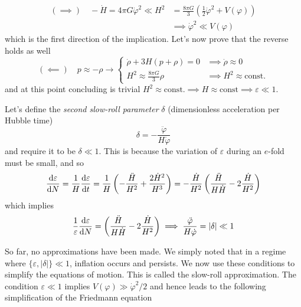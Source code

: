 \begin{align*}
    (\implies) \quad -\dot{H} = 4\pi G \dot{\varphi}^{2} \ll H^{2} &= \frac{8\pi G}{3}\left(\frac{1}{2}\dot{\varphi}^{2}+V(\varphi)\right) \\
    & \implies \dot{\varphi}^{2}\ll V(\varphi)
\end{align*}
which is the first direction of the implication. Let's now prove that the reverse holds as well
\begin{equation}
    (\impliedby) \quad p\approx -\rho \to
    \left\{
        \begin{array}{ll}
            \dot{\rho} +3H(p+\rho) = 0 & \implies \dot{\rho}\approx 0\\
            H^{2} \approx \frac{8\pi G}{3}\rho & \implies H^{2} \approx \text{const.}
        \end{array}
    \right.
\end{equation}
and at this point concluding is trivial $H^{2} \approx \text{const.} \implies H \approx \text{const} \implies \varepsilon \ll 1$.
\par Let's define the \emph{second slow-roll parameter} $\delta$ (dimensionless acceleration per Hubble time)
\begin{equation}
    \boxed{
        \delta = -\frac{\ddot{\varphi}}{H\dot{\varphi}}
    }
    \label{eq:slowroll2}
\end{equation}
and require it to be $\delta \ll 1$. This is because the variation of $\varepsilon$ during an $e$-fold must be small, and so 
\begin{equation}
    \frac{\text{d}\varepsilon}{\text{d}N} = \frac{1}{H}\frac{\text{d}\varepsilon}{\text{d}t} = \frac{1}{H}\left(-\frac{\ddot{H}}{H^{2}}+\frac{2\dot{H}^{2}}{H^{3}}\right) = -\frac{\dot{H}}{H^{2}}\left(\frac{\ddot{H}}{H\dot{H}}-2\frac{\dot{H}}{H^{2}}\right)
\end{equation}
which implies 
\begin{equation}
    \frac{1}{\varepsilon}\frac{\text{d}\varepsilon}{\text{d}N} = \left(\frac{\ddot{H}}{H\dot{H}}-2\frac{\dot{H}}{H^{2}}\right) \implies \frac{\ddot{\varphi}}{H\dot{\varphi}} = |\delta| \ll 1
\end{equation}
\par So far, no approximations have been made. We simply noted that in a regime where $\{\varepsilon, |\delta|\} \ll 1$, inflation occurs and persists. We now use these conditions to simplify the equations of motion. This is called the slow-roll approximation. The condition $\varepsilon \ll 1$ implies $V(\varphi) \gg \dot{\varphi}^{2}/2$ and hence leads to the following simplification of the Friedmann equation
